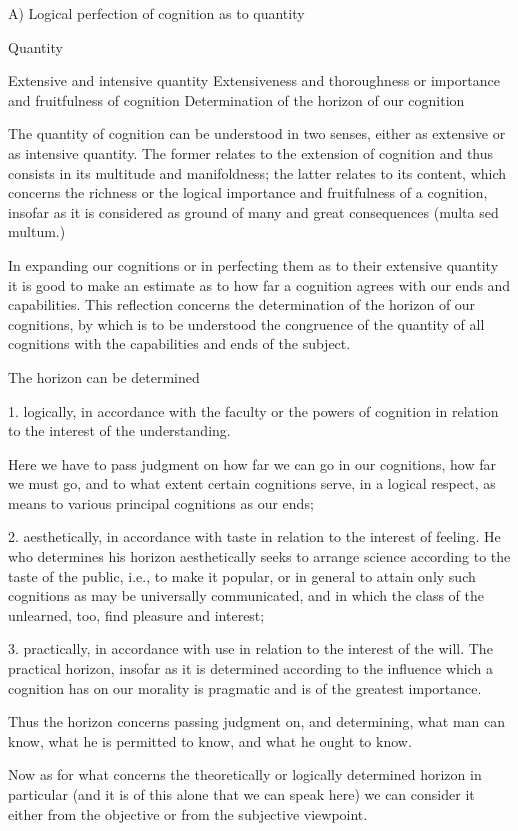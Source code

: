 A) Logical perfection of cognition as to quantity

Quantity

    Extensive and intensive quantity
    Extensiveness and thoroughness
    or importance and fruitfulness of cognition
    Determination of the horizon of our cognition

The quantity of cognition can be understood in two senses,
either as extensive or as intensive quantity.
The former relates to the extension of cognition and
thus consists in its multitude and manifoldness;
the latter relates to its content, which concerns the richness
or the logical importance and fruitfulness of a cognition,
insofar as it is considered as ground of
many and great consequences (multa sed multum.)

In expanding our cognitions or in perfecting them
as to their extensive quantity
it is good to make an estimate as to how far
a cognition agrees with our ends and capabilities.
This reflection concerns the determination of
the horizon of our cognitions,
by which is to be understood
the congruence of the quantity of all cognitions
with the capabilities and ends of the subject.

The horizon can be determined

1. logically, in accordance with the faculty or the powers of
cognition in relation to the interest of the understanding.

Here we have to pass judgment on how far we can go in our cognitions,
how far we must go, and to what extent certain cognitions serve,
in a logical respect, as means to various principal cognitions as our ends;

2. aesthetically, in accordance with taste
in relation to the interest of feeling.
He who determines his horizon aesthetically seeks
to arrange science according to the taste of the public,
i.e., to make it popular,
or in general to attain only such cognitions
as may be universally communicated,
and in which the class of the unlearned, too,
find pleasure and interest;

3. practically, in accordance with use
in relation to the interest of the will.
The practical horizon, insofar as it is determined
according to the influence which a cognition has
on our morality is pragmatic
and is of the greatest importance.

Thus the horizon concerns passing judgment on, and determining,
what man can know, what he is permitted to know, and what he ought to know.

Now as for what concerns the theoretically
or logically determined horizon in particular
(and it is of this alone that we can speak here)
we can consider it either from the objective
or from the subjective viewpoint.


